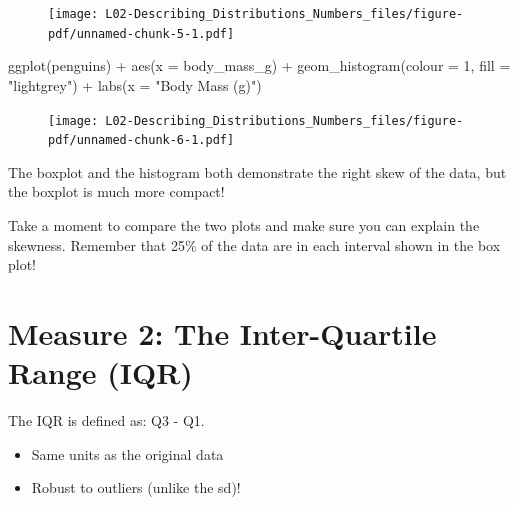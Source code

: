 \documentclass[
  letterpaper,
  DIV=11,
  numbers=noendperiod]{scrreprt}
\newenvironment{Shaded}{\begin{snugshade}}{\end{snugshade}}
\newcommand{\AttributeTok}[1]{\textcolor[rgb]{0.40,0.45,0.13}{#1}}
\newcommand{\DecValTok}[1]{\textcolor[rgb]{0.68,0.00,0.00}{#1}}
\newcommand{\FunctionTok}[1]{\textcolor[rgb]{0.28,0.35,0.67}{#1}}
\newcommand{\NormalTok}[1]{\textcolor[rgb]{0.00,0.23,0.31}{#1}}
\newcommand{\SpecialCharTok}[1]{\textcolor[rgb]{0.37,0.37,0.37}{#1}}
\newcommand{\StringTok}[1]{\textcolor[rgb]{0.13,0.47,0.30}{#1}}
\providecommand{\tightlist}{%
  \setlength{\itemsep}{0pt}\setlength{\parskip}{0pt}}\usepackage{longtable,booktabs,array}
\begin{document}
\begin{figure}[H]

{\centering \texttt{[image: L02-Describing\_Distributions\_Numbers\_files/figure-pdf/unnamed-chunk-5-1.pdf]}

}

\end{figure}

\begin{Shaded}
\begin{Highlighting}[]
\FunctionTok{ggplot}\NormalTok{(penguins) }\SpecialCharTok{+} 
    \FunctionTok{aes}\NormalTok{(}\AttributeTok{x =}\NormalTok{ body\_mass\_g) }\SpecialCharTok{+}
    \FunctionTok{geom\_histogram}\NormalTok{(}\AttributeTok{colour =} \DecValTok{1}\NormalTok{, }\AttributeTok{fill =} \StringTok{"lightgrey"}\NormalTok{) }\SpecialCharTok{+}
    \FunctionTok{labs}\NormalTok{(}\AttributeTok{x =} \StringTok{"Body Mass (g)"}\NormalTok{)}
\end{Highlighting}
\end{Shaded}

\begin{figure}[H]

{\centering \texttt{[image: L02-Describing\_Distributions\_Numbers\_files/figure-pdf/unnamed-chunk-6-1.pdf]}

}

\end{figure}

The boxplot and the histogram both demonstrate the right skew of the
data, but the boxplot is much more compact!

Take a moment to compare the two plots and make sure you can explain the
skewness. Remember that 25\% of the data are in each interval shown in
the box plot!

\hypertarget{measure-2-the-inter-quartile-range-iqr}{%
\section{Measure 2: The Inter-Quartile Range
(IQR)}\label{measure-2-the-inter-quartile-range-iqr}}

The IQR is defined as: Q3 - Q1.

\pspace

\begin{itemize}
\tightlist
\item
  Same units as the original data\lspace
\item
  Robust to outliers (unlike the sd)!
\end{itemize}
\end{document}
